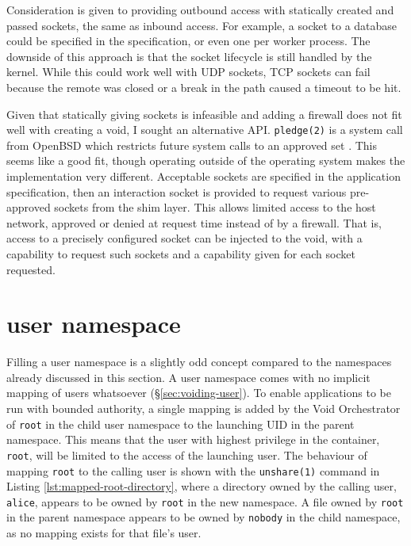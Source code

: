 \documentclass[12pt,a4paper,twoside]{report}
\begin{document}
Consideration is given to providing outbound access with statically created and passed sockets, the same as inbound access. For example, a socket to a database could be specified in the specification, or even one per worker process. The downside of this approach is that the socket lifecycle is still handled by the kernel. While this could work well with UDP sockets, TCP sockets can fail because the remote was closed or a break in the path caused a timeout to be hit.

Given that statically giving sockets is infeasible and adding a firewall does not fit well with creating a void, I sought an alternative API. \texttt{pledge(2)} is a system call from OpenBSD which restricts future system calls to an approved set \citep{the_openbsd_foundation_pledge2_2022}. This seems like a good fit, though operating outside of the operating system makes the implementation very different. Acceptable sockets are specified in the application specification, then an interaction socket is provided to request various pre-approved sockets from the shim layer. This allows limited access to the host network, approved or denied at request time instead of by a firewall. That is, access to a precisely configured socket can be injected to the void, with a capability to request such sockets and a capability given for each socket requested.

\section{user namespace}
\label{sec:filling-user}

Filling a user namespace is a slightly odd concept compared to the namespaces already discussed in this section. A user namespace comes with no implicit mapping of users whatsoever (§\ref{sec:voiding-user}). To enable applications to be run with bounded authority, a single mapping is added by the Void Orchestrator of \texttt{root} in the child user namespace to the launching UID in the parent namespace. This means that the user with highest privilege in the container, \texttt{root}, will be limited to the access of the launching user. The behaviour of mapping \texttt{root} to the calling user is shown with the \texttt{unshare(1)} command in Listing \ref{lst:mapped-root-directory}, where a directory owned by the calling user, \texttt{alice}, appears to be owned by \texttt{root} in the new namespace. A file owned by \texttt{root} in the parent namespace appears to be owned by \texttt{nobody} in the child namespace, as no mapping exists for that file's user.
\end{document}
